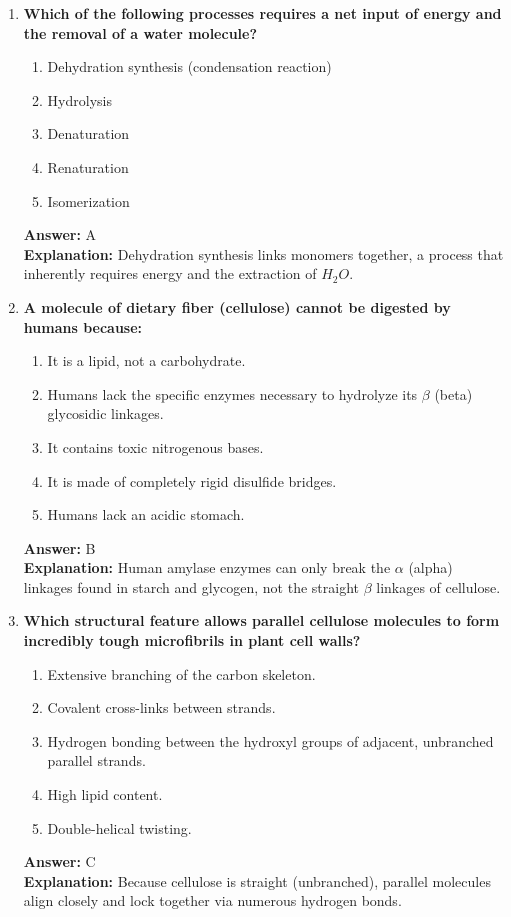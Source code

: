 \documentclass[11pt, a4paper]{article}
\begin{document}
\begin{enumerate}

\item \textbf{Which of the following processes requires a net input of energy and the removal of a water molecule?}
\begin{enumerate}[label=\Alph*.]
    \item Dehydration synthesis (condensation reaction)
    \item Hydrolysis
    \item Denaturation
    \item Renaturation
    \item Isomerization
\end{enumerate}
\textbf{Answer:} A \\
\textbf{Explanation:} Dehydration synthesis links monomers together, a process that inherently requires energy and the extraction of $H_2O$.

\item \textbf{A molecule of dietary fiber (cellulose) cannot be digested by humans because:}
\begin{enumerate}[label=\Alph*.]
    \item It is a lipid, not a carbohydrate.
    \item Humans lack the specific enzymes necessary to hydrolyze its $\beta$ (beta) glycosidic linkages.
    \item It contains toxic nitrogenous bases.
    \item It is made of completely rigid disulfide bridges.
    \item Humans lack an acidic stomach.
\end{enumerate}
\textbf{Answer:} B \\
\textbf{Explanation:} Human amylase enzymes can only break the $\alpha$ (alpha) linkages found in starch and glycogen, not the straight $\beta$ linkages of cellulose.

\item \textbf{Which structural feature allows parallel cellulose molecules to form incredibly tough microfibrils in plant cell walls?}
\begin{enumerate}[label=\Alph*.]
    \item Extensive branching of the carbon skeleton.
    \item Covalent cross-links between strands.
    \item Hydrogen bonding between the hydroxyl groups of adjacent, unbranched parallel strands.
    \item High lipid content.
    \item Double-helical twisting.
\end{enumerate}
\textbf{Answer:} C \\
\textbf{Explanation:} Because cellulose is straight (unbranched), parallel molecules align closely and lock together via numerous hydrogen bonds.


\end{enumerate}
\end{document}
